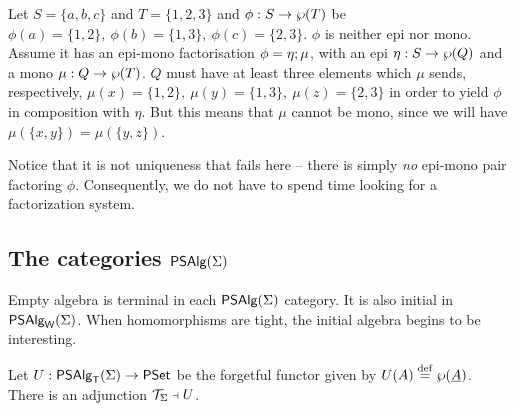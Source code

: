 \documentclass[10pt]{article}
\begin{document}
\begin{Proof}
Let $S=\{a,b,c\}$ and $T=\{1,2,3\}$ and $\phi:S\rightarrow\wp(T)$ be
$\phi(a)=\{1,2\},\ \phi(b)=\{1,3\},\ \phi(c)=\{2,3\}$. $\phi$ is
neither epi nor mono.  Assume it has an epi-mono factorisation
$\phi=\eta;\mu$, with an epi $\eta:S\rightarrow\wp(Q)$ and a mono
$\mu:Q\rightarrow\wp(T)$. $Q$ must have at least three elements which
$\mu$ sends, respectively, $\mu(x)=\{1,2\},\ \mu(y)=\{1,3\},\
\mu(z)=\{2,3\}$ in order to yield $\phi$ in composition with
$\eta$. But this means that $\mu$ cannot be mono, since we will have
$\mu(\{x,y\})=\mu(\{y,z\})$.
\end{Proof}

\noindent
Notice that it is not uniqueness that fails here -- there is simply {\em no}
epi-mono pair factoring $\phi$. Consequently, we do not have to spend time
looking for a factorization system.






\subsection{The categories $\mbox{\sf PSAlg}(\Sigma)$}

Empty algebra is terminal in each $\mbox{\sf PSAlg}(\Sigma)$ category.
It is also initial in $\mbox{\sf PSAlg}_{\sf W}(\Sigma)$.
When homomorphisms are tight, the initial algebra begins to be interesting.

\begin{Theorem}
\label{le:MAPStADJ}
Let $U:\mbox{\sf PSAlg}_{\sf T}(\Sigma)\rightarrow\mbox{\rm\sf PSet}$ be the forgetful functor given by
$U(A)\stackrel{{\rm \tiny{def}}}=\wp(\underline {A})$.  There is an adjunction ${\cal T}_{\Sigma}\mathrel{\scriptstyle\dashv} U$.
\end{Theorem}
\end{document}
